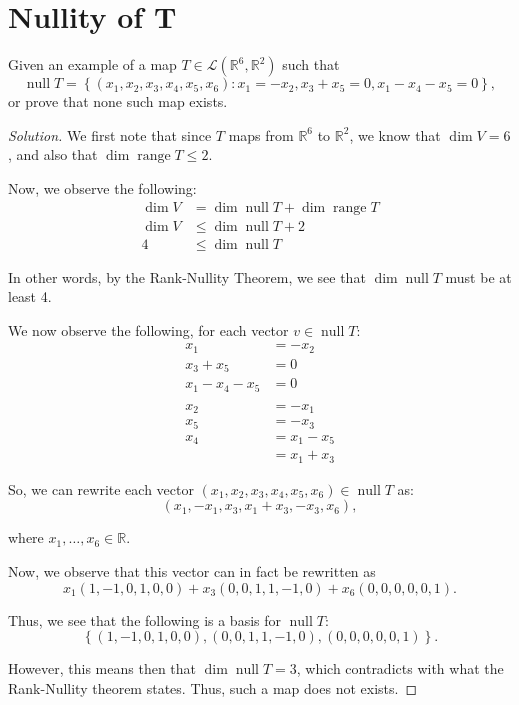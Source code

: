 \documentclass{article}
\newenvironment{solution}{\begin{proof}[Solution]}{\end{proof}}
\newcommand{\RR}{\mathbb{R}}
\DeclareMathOperator*{\vnull}{\mathrm{null}}
\DeclareMathOperator*{\vrange}{\mathrm{range}}
\begin{document}
	\section{Nullity of T}
	\begin{hw}
		Given an example of a map $T \in \mathcal L (\RR^{6}, \RR^{2})$ such that
		\begin{equation*}
			\vnull T = \left\{  (x_{1}, x_{2}, x_{3}, x_{4}, x_{5}, x_{6}) : x_{1} = - x_{2}, x_{3} + x_{5} = 0, x_{1} - x_{4} - x_{5} = 0 \right\},
		\end{equation*}
		or prove that none such map exists.
	\end{hw}
	\begin{solution}
		We first note that since $T$ maps from $\RR^{6}$ to $\RR^{2}$, we know that $\dim V = 6$, and also that $\dim \vrange T \leq 2$.
		
		Now, we observe the following:
		\begin{align*}
			\dim V &= \dim \vnull T + \dim \vrange T \\
			\dim V &\leq \dim \vnull T + 2 \\
			4 &\leq \dim \vnull T
		\end{align*}
		
		In other words, by the Rank-Nullity Theorem, we see that $\dim \vnull T$ must be at least 4.
		
		We now observe the following, for each vector $v \in \vnull T$:
		\begin{align*}
			x_{1} &= -x_{2} \\
			x_{3} + x_{5} &= 0 \\
			x_{1} - x_{4} - x_{5} &= 0 \\
			\\
			x_{2} &= -x_{1} \\
			x_{5} &= - x_{3} \\
			x_{4} &= x_{1} - x_{5} \\
			&= x_{1} + x_{3}
		\end{align*}
	
		So, we can rewrite each vector $(x_{1}, x_{2}, x_{3}, x_{4}, x_{5}, x_{6}) \in \vnull T$ as:
		\begin{equation*}
			(x_{1}, -x_{1}, x_{3}, x_{1} + x_{3}, -x_{3}, x_{6}),
		\end{equation*}
	
		where $x_{1}, \ldots, x_{6} \in \RR$.
		
		Now, we observe that this vector can in fact be rewritten as
		\begin{equation*}
			x_{1}(1, -1, 0, 1, 0, 0) + x_{3}(0, 0, 1, 1, -1, 0) + x_{6}(0,0,0,0,0,1).
		\end{equation*}
	
		Thus, we see that the following is a basis for $\vnull T$:
		\begin{equation*}
			\left\{  (1, -1, 0, 1, 0, 0),(0, 0, 1, 1, -1, 0) , (0,0,0,0,0,1) \right\}.
		\end{equation*}
	
		However, this means then that $\dim \vnull T = 3$, which contradicts with what the Rank-Nullity theorem states. Thus, such a map does not exists.
	\end{solution}
\end{document}
